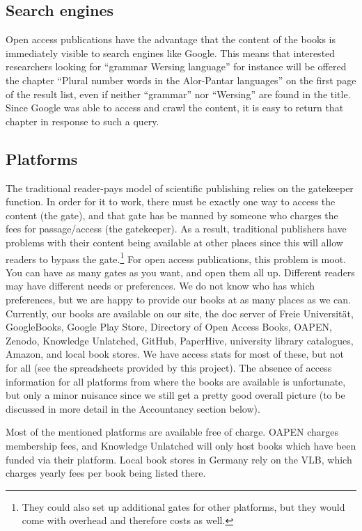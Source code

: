 \documentclass[output=guidelines,guidelines] {langscibook}
\begin{document}
\subsection{Search engines}
Open access publications have the advantage that the content of the books is immediately visible to search engines like Google. This means that interested researchers looking for ``grammar Wersing language'' for instance will be offered the chapter ``Plural number words in the Alor-Pantar languages'' on the first page of the result list, even if neither ``grammar'' nor ``Wersing'' are found in the title. Since Google was able to access and crawl the content, it is easy to return that chapter in response to such a query. 


\subsection{Platforms}
The traditional reader-pays model of scientific publishing relies on the gatekeeper function. In order for it to work, there must be exactly one way to access the content (the gate), and that gate has be manned by someone who charges the fees for passage/access (the gatekeeper). As a result, traditional publishers have problems with their content being available at other places since this will allow readers to bypass the gate.\footnote{They could also set up additional gates for other platforms, but they would come with overhead and therefore costs as well.} For open access publications, this problem is moot. You can have as many gates as you want, and open them all up. Different readers may have different needs or preferences. We do not know who has which preferences, but we are happy to provide our books at as many places as we can. Currently, our books are available on our site, the doc server of Freie Universität, GoogleBooks, Google Play Store, Directory of Open Access Books, OAPEN, Zenodo, Knowledge Unlatched, GitHub, PaperHive, university library catalogues, Amazon, and local book stores. We have access stats for most of these, but not for all (see the spreadsheets provided by this project). The absence of access information for all platforms from where the books are available is unfortunate, but only a minor nuisance since we still get a pretty good overall picture (to be discussed in more detail in the Accountancy %
section below).

Most of the mentioned platforms are available free of charge. OAPEN charges membership fees, and Knowledge Unlatched will only host books which have been funded via their platform. Local book stores in Germany rely on the VLB, which charges yearly fees per book being listed there.
\end{document}
